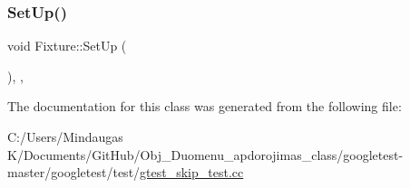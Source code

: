 \subsubsection{\texorpdfstring{SetUp()}{SetUp()}\hspace{0.1cm}{\footnotesize\ttfamily [2/2]}}
{\footnotesize\ttfamily void Fixture\+::\+Set\+Up (\begin{DoxyParamCaption}{ }\end{DoxyParamCaption})\hspace{0.3cm}{\ttfamily [inline]}, {\ttfamily [override]}, {\ttfamily [protected]}}



The documentation for this class was generated from the following file\+:\begin{DoxyCompactItemize}
\item 
C\+:/\+Users/\+Mindaugas K/\+Documents/\+Git\+Hub/\+Obj\+\_\+\+Duomenu\+\_\+apdorojimas\+\_\+class/googletest-\/master/googletest/test/\mbox{\hyperlink{googletest-master_2googletest_2test_2gtest__skip__test_8cc}{gtest\+\_\+skip\+\_\+test.\+cc}}\end{DoxyCompactItemize}
